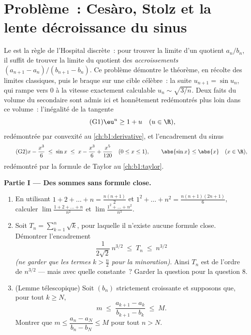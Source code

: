 \section{Problème~: Cesàro, Stolz et la lente décroissance du sinus}

\begin{problem}[{Devoir maison --- le \omterm{pb:b1:seq:1}{théorème de Cesàro--Stolz}
et l'asymptotique $u_n \sim \sqrt{3/n}$ pour $u_{n+1} = \sin
u_n$}]
\label{pb:b1:seq:1}
Le  est la règle de l'Hospital discrète~:
pour trouver la limite d'un quotient $a_n/b_n$, il suffit de trouver
la limite du quotient des \emph{accroissements} $(a_{n+1} -
a_n)/(b_{n+1} - b_n)$. Ce problème démontre le théorème, en récolte
des limites classiques, puis le braque sur une cible célèbre~: la
suite $u_{n+1} = \sin u_n$, qui rampe vers $0$ à la vitesse
exactement calculable $u_n \sim \sqrt{3/n}$.
Deux faits du volume du secondaire sont admis ici et honnêtement
redémontrés plus loin dans ce volume~: l'inégalité de la tangente
\[
\tag{G1} \eu^{u} \geq 1 + u \quad (u \in \R),
\]
redémontrée par convexité au \cref{ch:b1:derivative}, et
l'encadrement du sinus
\[
\tag{G2} x - \frac{x^3}{6} \;\leq\; \sin x \;\leq\; x -
\frac{x^3}{6} + \frac{x^5}{120} \quad (0 \leq x \leq 1), \qquad
\abs{\sin x} \leq \abs{x} \quad (x \in \R),
\]
redémontré par la formule de Taylor au \cref{ch:b1:taylor}.

\medskip
\noindent\textbf{Partie I --- Des sommes sans formule close.}
\begin{enumerate}
  \item En utilisant $1 + 2 + \dots + n = \frac{n(n+1)}{2}$ et $1^2 +
        \dots + n^2 = \frac{n(n+1)(2n+1)}{6}$, calculer
        $\lim \frac{1 + 2 + \dots + n}{n^2}$ et $\lim \frac{1^2 +
        \dots + n^2}{n^3}$.
  \item Soit $T_n = \sum_{k=1}^n \sqrt k$, pour laquelle il n'existe
        aucune formule close. Démontrer l'encadrement
        \[
        \frac{1}{2\sqrt 2}\,n^{3/2} \;\leq\; T_n \;\leq\;
        n^{3/2}
        \]
        \emph{(ne garder que les termes $k > \frac n2$ pour la
        minoration)}. Ainsi $T_n$ est de l'ordre de $n^{3/2}$ ---
        mais avec quelle constante~? Garder la question pour la
        question 8.
  \item (Lemme télescopique) Soit $(b_n)$ strictement croissante et
        supposons que, pour tout $k \geq N$,
        \[
        m \;\leq\; \frac{a_{k+1} - a_k}{b_{k+1} - b_k} \;\leq\;
        M .
        \]
        Montrer que $m \leq \dfrac{a_n - a_N}{b_n - b_N} \leq M$
        pour tout $n > N$.
\end{enumerate}


\end{problem}
